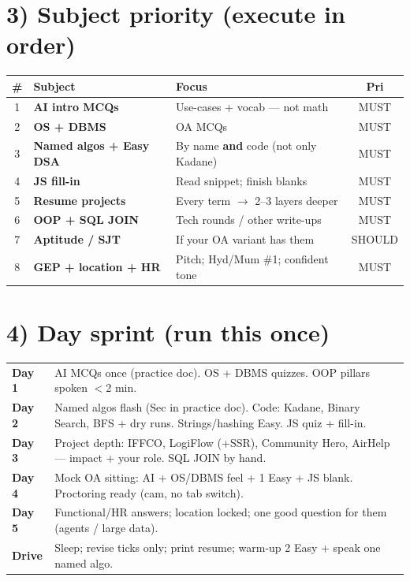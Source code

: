 \documentclass[a4paper,9pt]{extarticle}
\begin{document}
\section{3) Subject priority (execute in order)}
\noindent\begin{tabularx}{\textwidth}{@{}c >{\bfseries}p{3.5cm} X c@{}}
\# & Subject & Focus & Pri \\
\hline
1 & AI intro MCQs & Use-cases + vocab --- not math & MUST \\
2 & OS + DBMS & OA MCQs & MUST \\
3 & Named algos + Easy DSA & By name \textbf{and} code (not only Kadane) & MUST \\
4 & JS fill-in & Read snippet; finish blanks & MUST \\
5 & Resume projects & Every term $\to$ 2--3 layers deeper & MUST \\
6 & OOP + SQL JOIN & Tech rounds / other write-ups & MUST \\
7 & Aptitude / SJT & If your OA variant has them & SHOULD \\
8 & GEP + location + HR & Pitch; Hyd/Mum \#1; confident tone & MUST \\
\end{tabularx}

\section{4) Day sprint (run this once)}
\noindent\begin{tabularx}{\textwidth}{@{}p{1.8cm} X@{}}
\textbf{Day 1} & AI MCQs once (practice doc). OS + DBMS quizzes. OOP pillars spoken $<$2 min. \\
\textbf{Day 2} & Named algos flash (Sec in practice doc). Code: Kadane, Binary Search, BFS + dry runs. Strings/hashing Easy. JS quiz + fill-in. \\
\textbf{Day 3} & Project depth: IFFCO, LogiFlow (+SSR), Community Hero, AirHelp --- impact + your role. SQL JOIN by hand. \\
\textbf{Day 4} & Mock OA sitting: AI + OS/DBMS feel + 1 Easy + JS blank. Proctoring ready (cam, no tab switch). \\
\textbf{Day 5} & Functional/HR answers; location locked; one good question for them (agents / large data). \\
\textbf{Drive} & Sleep; revise ticks only; print resume; warm-up 2 Easy + speak one named algo. \\
\end{tabularx}
\end{document}
